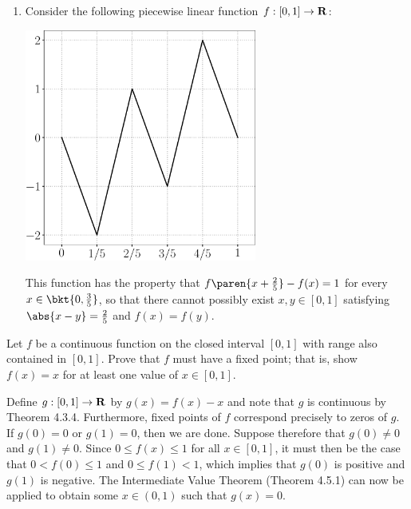 \documentclass{lew98_solutions}
\begin{document}
\begin{solution}
\begin{enumerate}
        \item Consider the following piecewise linear function \( f : [0, 1] \to \mathbf{R} \):
        \begin{center}
            \includegraphics[width=0.6\textwidth]{UA_Figures/UA_ex4_5_6_fig.pdf}
        \end{center}
        This function has the property that \( f \paren{x + \tfrac{2}{5}} - f(x) = 1 \) for every \( x \in \bkt{0, \tfrac{3}{5}} \), so that there cannot possibly exist \( x, y \in [0, 1] \) satisfying \( \abs{x - y} = \tfrac{2}{5} \) and \( f(x) = f(y) \).
    \end{enumerate}
\end{solution}

\begin{exercise}
\label{ex:4.5.7}
    Let \( f \) be a continuous function on the closed interval \( [0, 1] \) with range also contained in \( [0, 1] \). Prove that \( f \) must have a fixed point; that is, show \( f(x) = x \) for at least one value of \( x \in [0, 1] \).
\end{exercise}

\begin{solution}
    Define \( g : [0, 1] \to \mathbf{R} \) by \( g(x) = f(x) - x \) and note that \( g \) is continuous by Theorem 4.3.4. Furthermore, fixed points of \( f \) correspond precisely to zeros of \( g \). If \( g(0) = 0 \) or \( g(1) = 0 \), then we are done. Suppose therefore that \( g(0) \neq 0 \) and \( g(1) \neq 0 \). Since \( 0 \leq f(x) \leq 1 \) for all \( x \in [0, 1] \), it must then be the case that \( 0 < f(0) \leq 1 \) and \( 0 \leq f(1) < 1 \), which implies that \( g(0) \) is positive and \( g(1) \) is negative. The Intermediate Value Theorem (Theorem 4.5.1) can now be applied to obtain some \( x \in (0, 1) \) such that \( g(x) = 0 \).
\end{solution}
\end{document}
